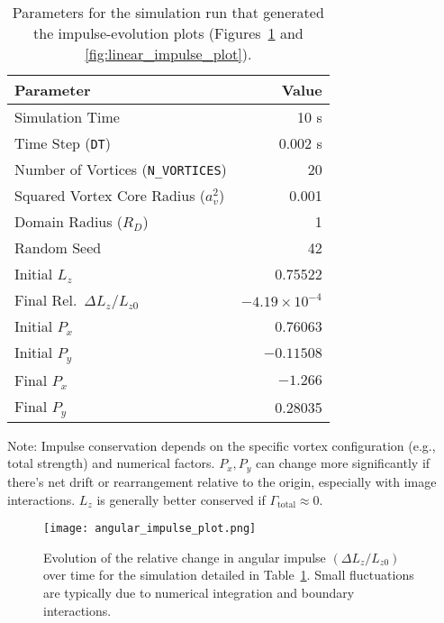 \documentclass[12pt,letterpaper]{article}
\newcommand{\domainradius}{R_D}
\newcommand{\corevsq}{a_v^2}
\begin{document}
\begin{table}[H]
    \centering
    \small
    \caption{Parameters for the simulation run that generated the impulse-evolution plots
             (Figures~\ref{fig:angular_impulse_plot} and \ref{fig:linear_impulse_plot}).}
    \label{tab:impulse_params}

    \begin{tabularx}{0.9\textwidth}{X r}
        \toprule
        \textbf{Parameter}                          & \textbf{Value} \\
        \midrule
        Simulation Time                             & 10 s \\
        Time Step (\texttt{DT})                     & 0.002 s \\
        Number of Vortices (\texttt{N\_VORTICES})   & 20 \\
        Squared Vortex Core Radius ($\corevsq$)     & 0.001 \\
        Domain Radius ($\domainradius$)             & 1 \\
        Random Seed                                 & 42 \\
        \midrule
        Initial $L_z$                               & 0.75522 \\
        Final Rel.\ $\Delta L_z / L_{z0}$           & $-4.19 \times 10^{-4}$ \\
        Initial $P_x$                               & 0.76063 \\
        Initial $P_y$                               & $-0.11508$ \\
        Final $P_x$                                 & $-1.266$ \\
        Final $P_y$                                 & 0.28035 \\
        \bottomrule
    \end{tabularx}

    \footnotesize\raggedright
    \vspace{0.5em}
    Note: Impulse conservation depends on the specific vortex configuration (e.g., total strength) and numerical factors. $P_x, P_y$ can change more significantly if there's net drift or rearrangement relative to the origin, especially with image interactions. $L_z$ is generally better conserved if $\Gamma_{\text{total}} \approx 0$.
\end{table}

\begin{figure}[H]
    \centering
    \texttt{[image: angular\_impulse\_plot.png]} 
    \caption{Evolution of the relative change in angular impulse $(\Delta L_z / L_{z0})$ over time for the simulation detailed in Table~\ref{tab:impulse_params}. Small fluctuations are typically due to numerical integration and boundary interactions.}
    \label{fig:angular_impulse_plot}
\end{figure}
\end{document}
